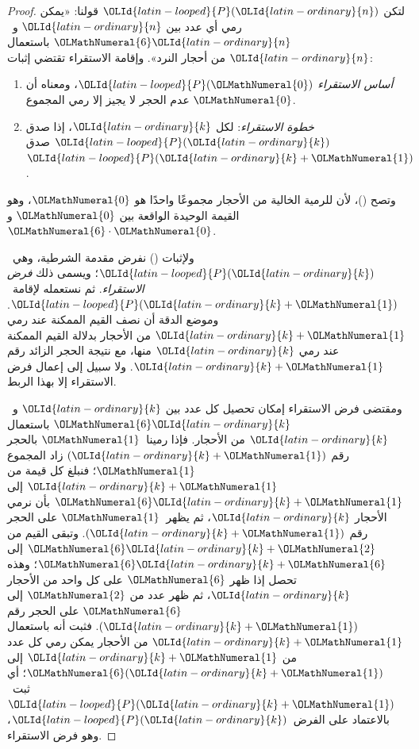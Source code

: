 \documentclass[../../../include/open-logic-section]{subfiles}
\begin{document}
\begin{proof}
لتكن $\OLId{latin-looped}{P}(\OLId{latin-ordinary}{n})$ قولنا: «يمكن رمي أي عدد بين $\OLId{latin-ordinary}{n}$ و~$\OLMathNumeral{6}\OLId{latin-ordinary}{n}$ باستعمال $\OLId{latin-ordinary}{n}$ من
أحجار النرد». وإقامة الاستقراء تقتضي إثبات:
\begin{enumerate}
\item \emph{أساس الاستقراء} $\OLId{latin-looped}{P}(\OLMathNumeral{0})$، ومعناه أن عدم الحجر لا يجيز إلا
  رمي المجموع $\OLMathNumeral{0}$.
\item \emph{خطوة الاستقراء}: لكل $\OLId{latin-ordinary}{k}$، إذا صدق $\OLId{latin-looped}{P}(\OLId{latin-ordinary}{k})$ صدق~$\OLId{latin-looped}{P}(\OLId{latin-ordinary}{k}+\OLMathNumeral{1})$.
\end{enumerate}

وتصح ()، لأن للرمية الخالية من الأحجار مجموعًا واحدًا هو $\OLMathNumeral{0}$، وهو
القيمة الوحيدة الواقعة بين $\OLMathNumeral{0}$ و~$\OLMathNumeral{6}\cdot\OLMathNumeral{0}$.

ولإثبات () نفرض مقدمة الشرطية، وهي~$\OLId{latin-looped}{P}(\OLId{latin-ordinary}{k})$؛ ويسمى ذلك
\emph{فرض الاستقراء}. ثم نستعمله لإقامة~$\OLId{latin-looped}{P}(\OLId{latin-ordinary}{k}+\OLMathNumeral{1})$. وموضع الدقة أن
نصف القيم الممكنة عند رمي $\OLId{latin-ordinary}{k}+\OLMathNumeral{1}$ من الأحجار بدلالة القيم الممكنة عند
رمي $\OLId{latin-ordinary}{k}$ منها، مع نتيجة الحجر الزائد رقم $\OLId{latin-ordinary}{k}+\OLMathNumeral{1}$. ولا سبيل إلى إعمال
فرض الاستقراء إلا بهذا الربط.

ومقتضى فرض الاستقراء إمكان تحصيل كل عدد بين $\OLId{latin-ordinary}{k}$ و~$\OLMathNumeral{6}\OLId{latin-ordinary}{k}$ باستعمال
$\OLId{latin-ordinary}{k}$ من الأحجار. فإذا رمينا~$\OLMathNumeral{1}$ بالحجر رقم $(\OLId{latin-ordinary}{k}+\OLMathNumeral{1})$ زاد المجموع $\OLMathNumeral{1}$؛
فنبلغ كل قيمة من $\OLId{latin-ordinary}{k}+\OLMathNumeral{1}$ إلى $\OLMathNumeral{6}\OLId{latin-ordinary}{k}+\OLMathNumeral{1}$ بأن نرمي الأحجار $\OLId{latin-ordinary}{k}$، ثم يظهر~$\OLMathNumeral{1}$
على الحجر رقم $(\OLId{latin-ordinary}{k}+\OLMathNumeral{1})$. وتبقى القيم من $\OLMathNumeral{6}\OLId{latin-ordinary}{k}+\OLMathNumeral{2}$ إلى $\OLMathNumeral{6}\OLId{latin-ordinary}{k}+\OLMathNumeral{6}$؛ وهذه تحصل
إذا ظهر $\OLMathNumeral{6}$ على كل واحد من الأحجار $\OLId{latin-ordinary}{k}$، ثم ظهر عدد من $\OLMathNumeral{2}$ إلى $\OLMathNumeral{6}$
على الحجر رقم $(\OLId{latin-ordinary}{k}+\OLMathNumeral{1})$. فثبت أنه باستعمال $\OLId{latin-ordinary}{k}+\OLMathNumeral{1}$ من الأحجار يمكن رمي
كل عدد من $\OLId{latin-ordinary}{k}+\OLMathNumeral{1}$ إلى $\OLMathNumeral{6}(\OLId{latin-ordinary}{k}+\OLMathNumeral{1})$؛ أي ثبت~$\OLId{latin-looped}{P}(\OLId{latin-ordinary}{k}+\OLMathNumeral{1})$ بالاعتماد على
الفرض~$\OLId{latin-looped}{P}(\OLId{latin-ordinary}{k})$، وهو فرض الاستقراء.
\end{proof}
\end{document}

